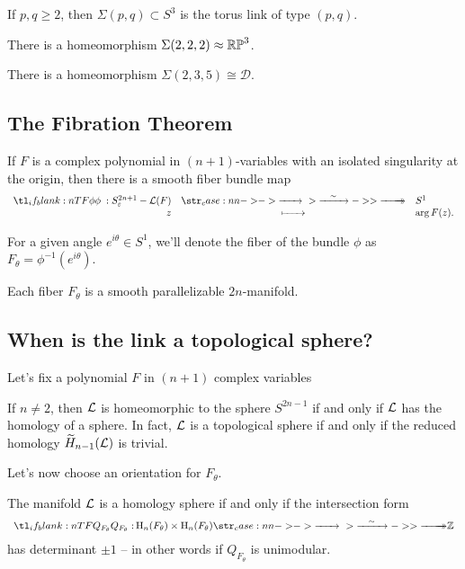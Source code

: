 \begin{proposition}
	If $p,q\geq 2$, then $\Sigma(p,q)\subset S^3$ is the torus link of type $(p,q)$.
\end{proposition}

\begin{proposition}
	There is a homeomorphism $\Sigma(2,2,2)\approx \mathbb{RP}^3$.
\end{proposition}

\begin{proposition}
	There is a homeomorphism $\Sigma(2,3,5)\cong \mathscr{D}$.
\end{proposition}

\subsection{The Fibration Theorem}

\begin{theorem}\label{thm:fibration}
	If $F$ is a complex polynomial in $(n+1)$-variables with an isolated singularity at the origin, then there is a smooth fiber bundle map
	\[
		\lkxfunc{\phi}{S^{2n+1}_\varepsilon - \L(F)}{S^1}{z}{\arg F(z).}
	\]
\end{theorem}

For a given angle $e^{i\theta}\in S^1$, we'll denote the fiber of the bundle $\phi$ as $F_\theta = \phi^{-1}(e^{i\theta})$.

\begin{proposition}
	Each fiber $F_\theta$ is a smooth parallelizable $2n$-manifold.
\end{proposition}

\subsection{When is the link a topological sphere?}

Let's fix a polynomial $F$ in $(n+1)$ complex variables

\begin{proposition}
	If $n\neq 2$, then $\mathcal{L}$ is homeomorphic to the sphere $S^{2n-1}$ if and only if $\mathcal{L}$ has the homology of a sphere. In fact, $\mathcal{L}$ is a topological sphere if and only if the reduced homology $\widetilde{H}_{n-1}(\mathcal{L})$ is trivial.
\end{proposition}

Let's now choose an orientation for $F_\theta$.

\begin{proposition}
	The manifold $\mathcal{L}$ is a homology sphere if and only if the intersection form
	\[
		\lkxfunc{Q_{F_\theta}}{\H_n(F_\theta)\times \H_n(F_\theta)}{\Z}
	\]
	has determinant $\pm 1$ -- in other words if $Q_{F_\theta}$ is unimodular.
\end{proposition}

